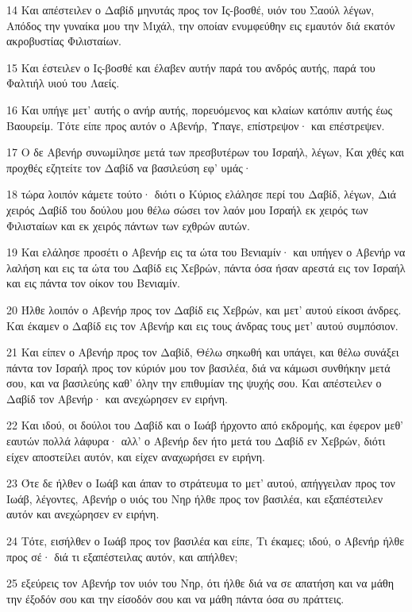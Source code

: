 \par 14 Και απέστειλεν ο Δαβίδ μηνυτάς προς τον Ις-βοσθέ, υιόν του Σαούλ λέγων, Απόδος την γυναίκα μου την Μιχάλ, την οποίαν ενυμφεύθην εις εμαυτόν διά εκατόν ακροβυστίας Φιλισταίων.
\par 15 Και έστειλεν ο Ις-βοσθέ και έλαβεν αυτήν παρά του ανδρός αυτής, παρά του Φαλτιήλ υιού του Λαείς.
\par 16 Και υπήγε μετ' αυτής ο ανήρ αυτής, πορευόμενος και κλαίων κατόπιν αυτής έως Βαουρείμ. Τότε είπε προς αυτόν ο Αβενήρ, Ύπαγε, επίστρεψον· και επέστρεψεν.
\par 17 Ο δε Αβενήρ συνωμίλησε μετά των πρεσβυτέρων του Ισραήλ, λέγων, Και χθές και προχθές εζητείτε τον Δαβίδ να βασιλεύση εφ' υμάς·
\par 18 τώρα λοιπόν κάμετε τούτο· διότι ο Κύριος ελάλησε περί του Δαβίδ, λέγων, Διά χειρός Δαβίδ του δούλου μου θέλω σώσει τον λαόν μου Ισραήλ εκ χειρός των Φιλισταίων και εκ χειρός πάντων των εχθρών αυτών.
\par 19 Και ελάλησε προσέτι ο Αβενήρ εις τα ώτα του Βενιαμίν· και υπήγεν ο Αβενήρ να λαλήση και εις τα ώτα του Δαβίδ εις Χεβρών, πάντα όσα ήσαν αρεστά εις τον Ισραήλ και εις πάντα τον οίκον του Βενιαμίν.
\par 20 Ήλθε λοιπόν ο Αβενήρ προς τον Δαβίδ εις Χεβρών, και μετ' αυτού είκοσι άνδρες. Και έκαμεν ο Δαβίδ εις τον Αβενήρ και εις τους άνδρας τους μετ' αυτού συμπόσιον.
\par 21 Και είπεν ο Αβενήρ προς τον Δαβίδ, Θέλω σηκωθή και υπάγει, και θέλω συνάξει πάντα τον Ισραήλ προς τον κύριόν μου τον βασιλέα, διά να κάμωσι συνθήκην μετά σου, και να βασιλεύης καθ' όλην την επιθυμίαν της ψυχής σου. Και απέστειλεν ο Δαβίδ τον Αβενήρ· και ανεχώρησεν εν ειρήνη.
\par 22 Και ιδού, οι δούλοι του Δαβίδ και ο Ιωάβ ήρχοντο από εκδρομής, και έφερον μεθ' εαυτών πολλά λάφυρα· αλλ' ο Αβενήρ δεν ήτο μετά του Δαβίδ εν Χεβρών, διότι είχεν αποστείλει αυτόν, και είχεν αναχωρήσει εν ειρήνη.
\par 23 Ότε δε ήλθεν ο Ιωάβ και άπαν το στράτευμα το μετ' αυτού, απήγγειλαν προς τον Ιωάβ, λέγοντες, Αβενήρ ο υιός του Νηρ ήλθε προς τον βασιλέα, και εξαπέστειλεν αυτόν και ανεχώρησεν εν ειρήνη.
\par 24 Τότε, εισήλθεν ο Ιωάβ προς τον βασιλέα και είπε, Τι έκαμες; ιδού, ο Αβενήρ ήλθε προς σέ· διά τι εξαπέστειλας αυτόν, και απήλθεν;
\par 25 εξεύρεις τον Αβενήρ τον υιόν του Νηρ, ότι ήλθε διά να σε απατήση και να μάθη την έξοδόν σου και την είσοδόν σου και να μάθη πάντα όσα συ πράττεις.
